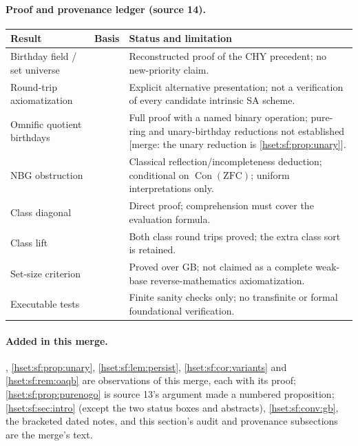 \documentclass[11pt,letterpaper]{article}
\theoremstyle{definition}
\theoremstyle{remark}
\newcommand{\ZFC}{\mathrm{ZFC}}
\newcommand{\Con}{\operatorname{Con}}
\begin{document}
\paragraph{Proof and provenance ledger (source 14).}
\begin{center}\small
\begin{longtable}{@{}P{0.25\textwidth}P{0.31\textwidth}P{0.36\textwidth}@{}}
\toprule
Result & Basis & Status and limitation\\
\midrule\endhead
Birthday field / set universe &  & Reconstructed proof of the CHY precedent; no new-priority claim.\\
Round-trip axiomatization &  & Explicit alternative presentation; not a verification of every candidate intrinsic SA scheme.\\
Omnific quotient birthdays &  & Full proof with a named binary operation; pure-ring and unary-birthday reductions not established [merge: the unary reduction is \cref{hset:sf:prop:unary}].\\
NBG obstruction &  & Classical reflection/incompleteness deduction; conditional on $\Con(\ZFC)$; uniform interpretations only.\\
Class diagonal &  & Direct proof; comprehension must cover the evaluation formula.\\
Class lift &  & Both class round trips proved; the extra class sort is retained.\\
Set-size criterion &  & Proved over GB; not claimed as a complete weak-base reverse-mathematics axiomatization.\\
Executable tests &  & Finite sanity checks only; no transfinite or formal foundational verification.\\
\bottomrule
\end{longtable}
\end{center}

\paragraph{Added in this merge.} ,
\cref{hset:sf:prop:unary}, \cref{hset:sf:lem:persist}, \cref{hset:sf:cor:variants}
and \cref{hset:sf:rem:oaqb} are observations of this merge, each with its proof;
\cref{hset:sf:prop:purenogo} is source 13's argument made a numbered proposition;
\cref{hset:sf:sec:intro} (except the two status boxes and abstracts),
\cref{hset:sf:conv:gb}, the bracketed dated notes, and this section's audit and
provenance subsections are the merge's text.
\end{document}
